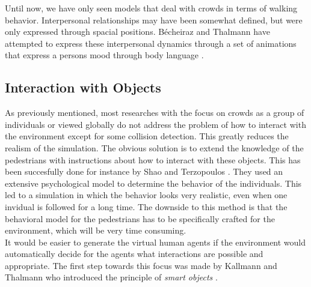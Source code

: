 \documentclass[11pt]{book}
\begin{document}
Until now, we have only seen models that deal with crowds in terms of walking behavior. Interpersonal relationships may have been somewhat defined, but were only expressed through spacial positions. Bécheiraz and Thalmann have attempted to express these interpersonal dynamics through a set of animations that express a persons mood through body language \cite{Becheiraz:1996:MNC:791215.791499}.

\subsection{Interaction with Objects}
As previously mentioned, most researches with the focus on crowds as a group of individuals or viewed globally do not address the problem of how to interact with the environment except for some collision detection. This greatly reduces the realism of the simulation. The obvious solution is to extend the knowledge of the pedestrians with instructions about how to interact with these objects. This has been succesfully done for instance by Shao and Terzopoulos \cite{A_autonomouspedestrians}. They used an extensive psychological model to determine the behavior of the individuals. This led to a simulation in which the behavior looks very realistic, even when one invidual is followed for a long time. The downside to this method is that the behavioral model for the pedestrians has to be specifically crafted for the environment, which will be very time consuming. \\
It would be easier to generate the virtual human agents if the environment would automatically decide for the agents what interactions are possible and appropriate. The first step towards this focus was made by Kallmann and Thalmann who introduced the principle of \textit{smart objects} \cite{Kallmann98modelingobjects}.
\end{document}
